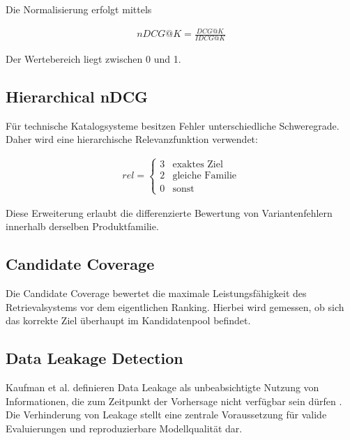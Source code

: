 Die Normalisierung erfolgt mittels

\begin{align}
  nDCG@K = \frac{DCG@K}{IDCG@K}
\end{align}

Der Wertebereich liegt zwischen 0 und 1.

\subsection{Hierarchical nDCG}

Für technische Katalogsysteme besitzen Fehler unterschiedliche Schweregrade.
Daher wird eine hierarchische Relevanzfunktion verwendet:

\begin{align}
  rel= \begin{cases} 3 & \text{exaktes Ziel}\\ 2 & \text{gleiche Familie}\\ 0 & \text{sonst} \end{cases}
\end{align}

Diese Erweiterung erlaubt die differenzierte Bewertung von Variantenfehlern innerhalb derselben Produktfamilie.

\subsection{Candidate Coverage}

Die Candidate Coverage bewertet die maximale Leistungsfähigkeit des Retrievalsystems vor dem eigentlichen Ranking.
Hierbei wird gemessen, ob sich das korrekte Ziel überhaupt im Kandidatenpool befindet.

\subsection{Data Leakage Detection}

Kaufman et al. definieren Data Leakage als unbeabsichtigte Nutzung von Informationen, die zum Zeitpunkt der Vorhersage nicht verfügbar sein dürfen \cite{kaufman2012leakage}.
Die Verhinderung von Leakage stellt eine zentrale Voraussetzung für valide Evaluierungen und reproduzierbare Modellqualität dar.

